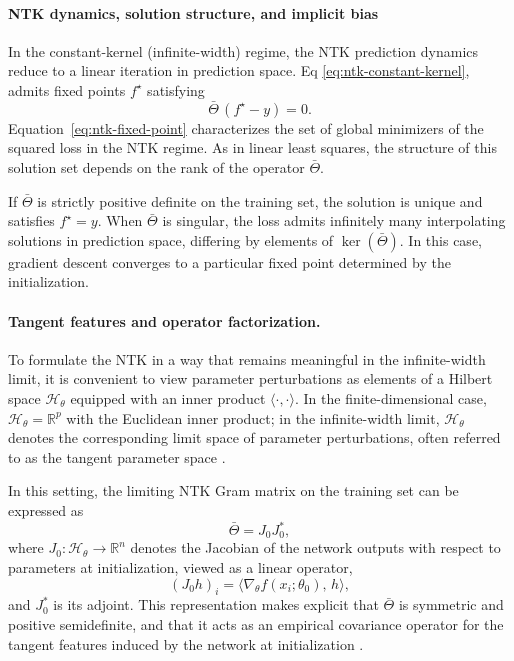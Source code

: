 \paragraph{NTK dynamics, solution structure, and implicit bias}

In the constant-kernel (infinite-width) regime, the NTK prediction dynamics
reduce to a linear iteration in prediction space. Eq \ref{eq:ntk-constant-kernel},
admits fixed points $f^\star$ satisfying
\begin{equation}
	\bar\Theta\,(f^\star - y) = 0.
	\label{eq:ntk-fixed-point}
\end{equation}
Equation~\eqref{eq:ntk-fixed-point} characterizes the set of global minimizers of
the squared loss in the NTK regime. As in linear least squares, the structure of
this solution set depends on the rank of the operator $\bar\Theta$.

If $\bar\Theta$ is strictly positive definite on the training set, the solution
is unique and satisfies $f^\star = y$. When $\bar\Theta$ is singular, the loss
admits infinitely many interpolating solutions in prediction space, differing
by elements of $\ker(\bar\Theta)$. In this case, gradient descent converges to a
particular fixed point determined by the initialization.

\paragraph{Tangent features and operator factorization.}
To formulate the NTK in a way that remains meaningful in the infinite-width
limit, it is convenient to view parameter perturbations as elements of a
Hilbert space $\mathcal{H}_\theta$ equipped with an inner product
$\langle\cdot,\cdot\rangle$. In the finite-dimensional case,
$\mathcal{H}_\theta=\mathbb{R}^p$ with the Euclidean inner product; in the
infinite-width limit, $\mathcal{H}_\theta$ denotes the corresponding limit
space of parameter perturbations, often referred to as the tangent parameter
space \citep{jacot2018ntk, lee2020wide}.

In this setting, the limiting NTK Gram matrix on the training set can be
expressed as
\begin{equation}
	\bar\Theta = J_0 J_0^\ast,
\end{equation}
where $J_0 : \mathcal{H}_\theta \to \mathbb{R}^n$ denotes the Jacobian of the
network outputs with respect to parameters at initialization, viewed as a
linear operator,
\[
	(J_0 h)_i = \langle \nabla_\theta f(x_i;\theta_0),\,h\rangle,
\]
and $J_0^\ast$ is its adjoint. This representation makes explicit that
$\bar\Theta$ is symmetric and positive semidefinite, and that it acts as an
empirical covariance operator for the tangent features induced by the network
at initialization \citep{jacot2018ntk}.

